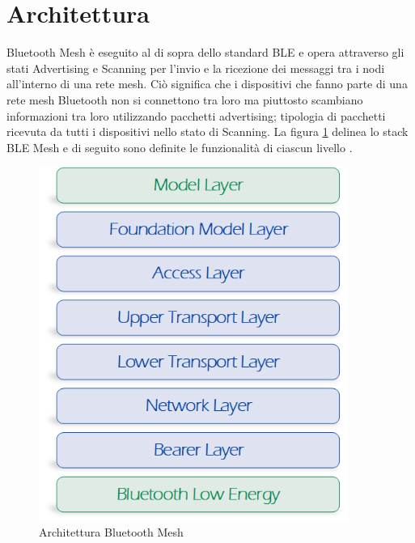 \section{Architettura}
Bluetooth Mesh è eseguito al di sopra dello standard BLE e opera attraverso gli stati Advertising e Scanning per l'invio e la ricezione dei messaggi tra i nodi all'interno di una rete mesh. Ciò significa che i dispositivi che fanno parte di una rete mesh Bluetooth non si connettono tra loro ma piuttosto scambiano informazioni tra loro utilizzando pacchetti advertising; tipologia di pacchetti ricevuta da tutti i dispositivi nello stato di Scanning.
La figura \ref{fig:ble_mesh_architecture} delinea lo stack BLE Mesh e di seguito sono definite le funzionalità di ciascun livello \cite{bluetooth2019b, afaneh2018intro}.
\begin{figure}[!ht]
    \centering
    \includegraphics[width = 0.9\textwidth]{images/Layer BLE Mesh.png}
    \caption{Architettura Bluetooth Mesh}
    \label{fig:ble_mesh_architecture}
\end{figure}
